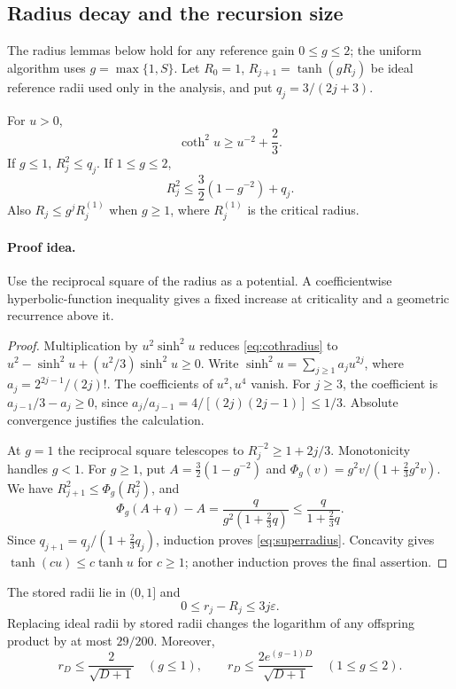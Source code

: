 \subsection{Radius decay and the recursion size}\label{sec:cost}

The radius lemmas below hold for any reference gain \(0\le g\le2\);
the uniform algorithm uses \(g=\max\{1,S\}\).
Let \(R_0=1\), \(R_{j+1}=\tanh(gR_j)\) be ideal reference radii
used only in the analysis, and put \(q_j=3/(2j+3)\).

\begin{lemma}\label{lem:radius}
For \(u>0\),
\begin{equation}\label{eq:cothradius}
\coth^2u\ge u^{-2}+\frac23.
\end{equation}
If \(g\le1\), \(R_j^2\le q_j\).
If \(1\le g\le2\),
\begin{equation}\label{eq:superradius}
R_j^2\le\frac32(1-g^{-2})+q_j.
\end{equation}
Also \(R_j\le g^jR_j^{(1)}\) when \(g\ge1\), where
\(R_j^{(1)}\) is the critical radius.
\end{lemma}
\paragraph{Proof idea.}
Use the reciprocal square of the radius as a potential. A coefficientwise
hyperbolic-function inequality gives a fixed increase at criticality and a
geometric recurrence above it.

\begin{proof}
Multiplication by \(u^2\sinh^2u\) reduces
\eqref{eq:cothradius} to
\(u^2-\sinh^2u+(u^2/3)\sinh^2u\ge0\).
Write \(\sinh^2u=\sum_{j\ge1}a_ju^{2j}\), where
\(a_j=2^{2j-1}/(2j)!\).
The coefficients of \(u^2,u^4\) vanish. For \(j\ge3\), the
coefficient is \(a_{j-1}/3-a_j\ge0\), since
\(a_j/a_{j-1}=4/[(2j)(2j-1)]\le1/3\).
Absolute convergence justifies the calculation.

At \(g=1\) the reciprocal square telescopes to
\(R_j^{-2}\ge1+2j/3\). Monotonicity handles \(g<1\).
For \(g\ge1\), put \(A=\frac32(1-g^{-2})\) and
\(\Phi_g(v)=g^2v/(1+\frac23g^2v)\).
We have \(R_{j+1}^2\le\Phi_g(R_j^2)\), and
\[
\Phi_g(A+q)-A=\frac{q}{g^2(1+\frac23q)}
\le\frac{q}{1+\frac23q}.
\]
Since \(q_{j+1}=q_j/(1+\frac23q_j)\), induction proves
\eqref{eq:superradius}.
Concavity gives \(\tanh(cu)\le c\tanh u\) for \(c\ge1\);
another induction proves the final assertion.
\end{proof}

\begin{lemma}\label{lem:rounding}
The stored radii lie in \((0,1]\) and
\[
0\le r_j-R_j\le3j\varepsilon.
\]
Replacing ideal radii by stored radii changes the logarithm of any
offspring product by at most \(29/200\). Moreover,
\[
r_D\le\frac2{\sqrt{D+1}}\quad(g\le1),\qquad
r_D\le\frac{2e^{(g-1)D}}{\sqrt{D+1}}\quad(1\le g\le2).
\]
\end{lemma}
